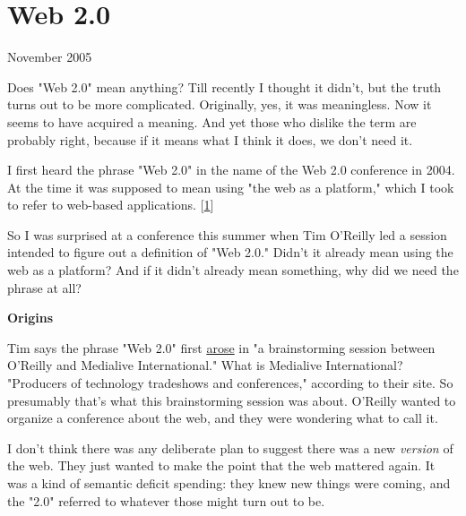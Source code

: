 \chapter{Web 2.0}


            
              
                


                  
                    November 2005

Does "Web 2.0" mean anything? Till
                    recently I thought it didn't, but the truth turns out to be
                    more complicated. Originally, yes, it was meaningless. Now
                    it seems to have acquired a meaning. And yet those who
                    dislike the term are probably right, because if it means
                    what I think it does, we don't need it.

I first
                    heard the phrase "Web 2.0" in the name of the Web 2.0
                    conference in 2004. At the time it was supposed to mean
                    using "the web as a platform," which I took to refer to
                    web-based applications.
                    [\href{\#f1n}{1}]

So I was surprised at a conference this summer
                    when Tim O'Reilly led a session intended to figure out a
                    definition of "Web 2.0." Didn't it already mean using the
                    web as a platform? And if it didn't already mean something,
                    why did we need the phrase at all?

\textbf{Origins}

Tim says the phrase "Web 2.0" first
                    \href{http://www.oreillynet.com/pub/a/oreilly/tim/news/2005/09/30/what-is-web-20
.html}{arose}
                    in "a brainstorming session between O'Reilly and Medialive
                    International." What is Medialive International? "Producers
                    of technology tradeshows and conferences," according to
                    their site. So presumably that's what this brainstorming
                    session was about. O'Reilly wanted to organize a conference
                    about the web, and they were wondering what to call it.

I
                    don't think there was any deliberate plan to suggest there
                    was a new \emph{version} of the web. They just wanted to
                    make the point that the web mattered again. It was a kind of
                    semantic deficit spending: they knew new things were coming,
                    and the "2.0" referred to whatever those might turn out to
                    be.

